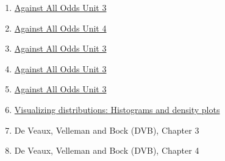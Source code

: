 \documentclass[letterpaper,12pt,twoside,]{pinp}
\providecommand{\tightlist}{%
  \setlength{\itemsep}{0pt}\setlength{\parskip}{0pt}}
\begin{document}
\begin{enumerate}
\def\labelenumi{\arabic{enumi}.}
\tightlist
\item
  \href{https://www.learner.org/wp-content/uploads/2019/03/AgainstAllOdds_StudentGuide_Unit03.pdf}{Against
  All Odds Unit 3}
\item
  \href{https://www.learner.org/wp-content/uploads/2019/03/AgainstAllOdds_StudentGuide_Unit04.pdf}{Against
  All Odds Unit 4}
\item
  \href{https://www.learner.org/wp-content/uploads/2019/03/AgainstAllOdds_StudentGuide_Unit05.pdf}{Against
  All Odds Unit 3}
\item
  \href{https://www.learner.org/wp-content/uploads/2019/03/AgainstAllOdds_StudentGuide_Unit06.pdf}{Against
  All Odds Unit 3}
\item
  \href{https://www.learner.org/wp-content/uploads/2019/03/AgainstAllOdds_StudentGuide_Unit07.pdf}{Against
  All Odds Unit 3}
\item
  \href{https://clauswilke.com/dataviz/histograms-density-plots.html}{Visualizing
  distributions: Histograms and density plots}
\item
  De Veaux, Velleman and Bock (DVB), Chapter 3
\item
  De Veaux, Velleman and Bock (DVB), Chapter 4
\end{enumerate}





\end{document}

